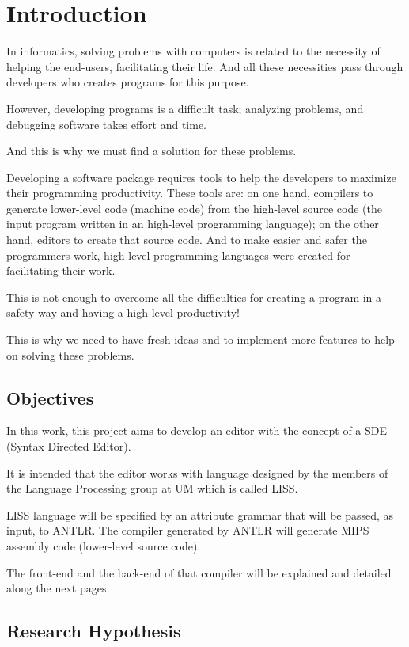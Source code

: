 \documentclass[
  oneside,
  11pt, a4paper,
  footinclude=true,
  headinclude=true,
  cleardoublepage=empty
]{scrbook}
\begin{document}
	
	
	\chapter{Introduction}
In informatics, solving problems with computers is related to the necessity of helping the end-users, facilitating their life.
And all these necessities pass through developers who creates programs for this purpose.

However, developing programs is a difficult task; analyzing problems, and debugging software takes effort and time.

And this is why we must find a solution for these problems.

Developing a software package  requires tools to help the developers to maximize their programming productivity.
These tools are: on one hand, compilers to generate lower-level code (machine code) from the high-level source code (the input program written in an high-level programming language); on the other hand, editors to create that source code.
And to make easier and safer the programmers work, high-level programming languages were created for facilitating their work.

This is not enough to overcome all the difficulties for creating a program in a safety way and having  a high level productivity!

This is why we need to have fresh ideas and to implement more features to help on solving these problems.

\section{Objectives}
In this work, this project aims to develop an editor with the concept of a SDE (Syntax Directed Editor).

It is intended that the editor works with language designed by the members of the Language Processing group at UM which is called LISS.

LISS language will be specified by an attribute grammar that will be passed, as input, to ANTLR. The compiler generated by ANTLR will generate MIPS assembly code (lower-level source code).

The front-end and the back-end of that compiler will be explained and detailed along the next pages.

\section{Research Hypothesis}
\end{document}
